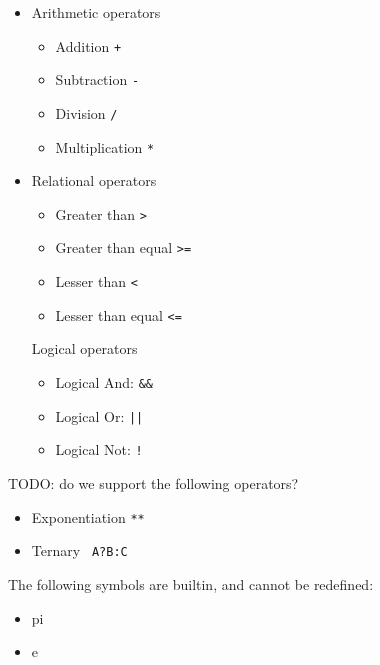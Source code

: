 \documentclass{article}
\begin{document}
\begin{itemize}
\item Arithmetic operators
\begin{itemize}
\item Addition \verb|+|
\item Subtraction \verb|-|
\item Division \verb|/|
\item Multiplication \verb|*|
\end{itemize}

\item Relational operators
\begin{itemize}
\item Greater than \verb|>|
\item Greater than equal \verb|>=|
\item Lesser than \verb|<|
\item Lesser than equal \verb|<=|
\end{itemize}

Logical operators
\begin{itemize}
\item Logical And: \verb|&&|
\item Logical Or:  \verb+||+
\item Logical Not: \verb|!|
\end{itemize}

\end{itemize}


TODO: do we support the following operators?
\begin{itemize}
\item Exponentiation \verb|**|
\item Ternary \verb| A?B:C |
\end{itemize}


The following symbols are builtin, and cannot be redefined:
\begin{itemize}
\item pi
\item e
\end{itemize}
\end{document}
